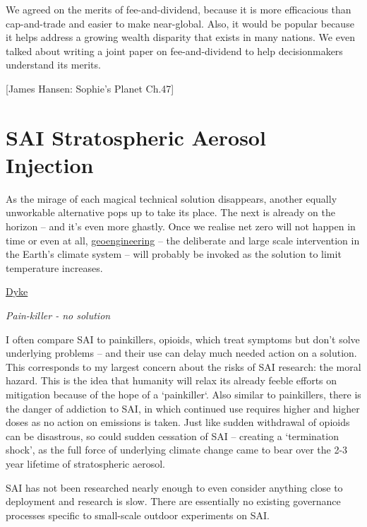 \documentclass[
]{book}
\begin{document}
We agreed on the merits of fee-and-dividend, because it is
more efficacious than cap-and-trade and easier to make near-global. Also, it would be popular
because it helps address a growing wealth disparity that exists in many nations. We even talked
about writing a joint paper on fee-and-dividend to help decisionmakers understand its merits.

{[}James Hansen: Sophie's Planet Ch.47{]}

\hypertarget{sai-stratospheric-aerosol-injection-1}{%
\chapter{SAI Stratospheric Aerosol Injection}\label{sai-stratospheric-aerosol-injection-1}}

As the mirage of each magical technical solution disappears, another equally unworkable alternative pops up to take its place. The next is already on the horizon -- and it's even more ghastly. Once we realise net zero will not happen in time or even at all, \href{https://theconversation.com/why-you-need-to-get-involved-in-the-geoengineering-debate-now-85619}{geoengineering} -- the deliberate and large scale intervention in the Earth's climate system -- will probably be invoked as the solution to limit temperature increases.

\href{https://theconversation.com/climate-scientists-concept-of-net-zero-is-a-dangerous-trap-157368}{Dyke}

\emph{Pain-killer - no solution}

I often compare SAI to painkillers, opioids, which treat symptoms but don't solve underlying problems -- and their use can delay much needed action on a solution.
This corresponds to my largest concern about the risks of SAI research: the moral hazard. This is the idea that humanity will relax its already feeble efforts on mitigation because of the hope of a `painkiller`.
Also similar to painkillers, there is the danger of addiction to SAI, in which continued use requires higher and higher doses as no action on emissions is taken. Just like sudden withdrawal of opioids can be disastrous, so could sudden cessation of SAI -- creating a `termination shock', as the full force of underlying climate change came to bear over the 2-3 year lifetime of stratospheric aerosol.

SAI has not been researched nearly enough to even consider anything close to deployment and research is slow. There are essentially no existing governance processes specific to small-scale outdoor experiments on SAI.
\end{document}
